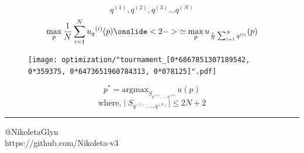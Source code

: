 \documentclass{beamer}
\begin{document}
\begin{frame}
\begin{block}
\huge
\[ q^{(1)}, q^{(2)}, q^{(3)} \dots q^{(N)} \]
\vfill
\large
\begin{equation*}
  \max_p \frac{1}{N} \sum_{i=1} ^ {N} {u_q}^{(i)} (p) \onslide<2->{\simeq \max_p  
  u_{\frac {1}{N} \sum_{i=1} ^ N q^{(i)}}(p)} 
\end{equation*}
\end{block}
\end{frame}

\begin{frame}
\begin{figure}[H]
  \texttt{[image: optimization/"tournament\_[0*6867851307189542, 0*359375, 0*6473651960784313, 0*078125]".pdf]}    
\end{figure}
\end{frame}

\begin{frame}
\begin{block}
\huge
\[  p^* = \text{argmax}_{S_{q^{(1)}, \dots, q^{(n)}}} u (p)  \]
\vfill
\[ \text{where,} \mid S_{q^{(1)}, \dots, q^{(n)}} \mid  \leq 2N + 2  \]
\end{block}
\pause

\vspace{0.5cm}
\rule{\textwidth}{1pt}
\centering

    \small{@NikoletaGlyn}\\
    \small{https://github.com/Nikoleta-v3}\\
\end{frame}
\end{document}
